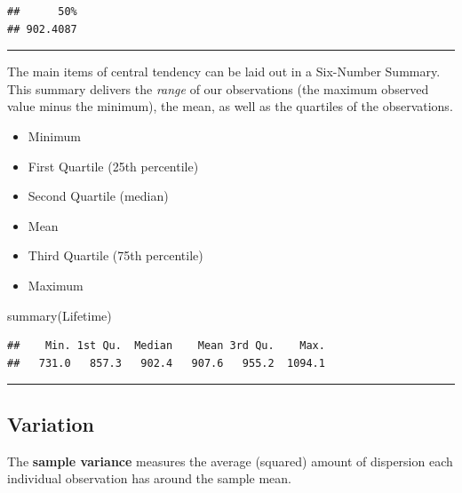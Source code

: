 \documentclass[
]{book}
\newenvironment{Shaded}{\begin{snugshade}}{\end{snugshade}}
\newcommand{\FunctionTok}[1]{\textcolor[rgb]{0.00,0.00,0.00}{#1}}
\newcommand{\NormalTok}[1]{#1}
\providecommand{\tightlist}{%
  \setlength{\itemsep}{0pt}\setlength{\parskip}{0pt}}
\begin{document}
\begin{verbatim}
##      50% 
## 902.4087
\end{verbatim}

\begin{center}\rule{0.5\linewidth}{0.5pt}\end{center}

The main items of central tendency can be laid out in a Six-Number Summary. This summary delivers the \emph{range} of our observations (the maximum observed value minus the minimum), the mean, as well as the quartiles of the observations.

\begin{itemize}
\tightlist
\item
  Minimum
\item
  First Quartile (25th percentile)
\item
  Second Quartile (median)
\item
  Mean
\item
  Third Quartile (75th percentile)
\item
  Maximum
\end{itemize}

\begin{Shaded}
\begin{Highlighting}[]
\FunctionTok{summary}\NormalTok{(Lifetime)}
\end{Highlighting}
\end{Shaded}

\begin{verbatim}
##    Min. 1st Qu.  Median    Mean 3rd Qu.    Max. 
##   731.0   857.3   902.4   907.6   955.2  1094.1
\end{verbatim}

\begin{center}\rule{0.5\linewidth}{0.5pt}\end{center}

\hypertarget{variation}{%
\subsection{Variation}\label{variation}}

The \textbf{sample variance} measures the average (squared) amount of dispersion each individual observation has around the sample mean.
\end{document}
